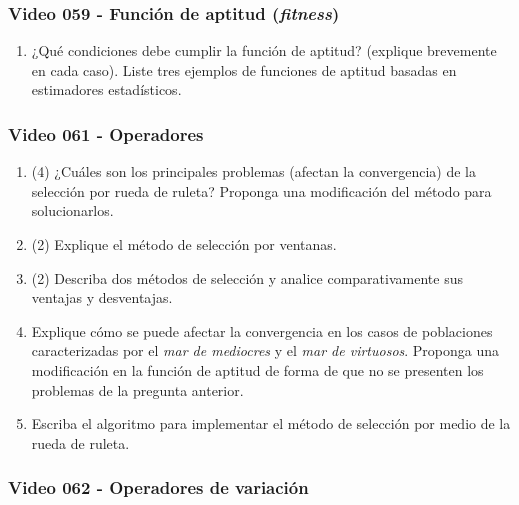 \documentclass[a4paper,10pt,spanish]{article}
\begin{document}
\subsubsection{Video 059 - Función de aptitud (\textit{fitness})}

\begin{enumerate}
\item ¿Qué condiciones debe cumplir la función de aptitud? (explique brevemente en cada caso). Liste tres ejemplos de funciones de aptitud basadas en estimadores estadísticos.
\end{enumerate}

\subsubsection{Video 061 - Operadores}

\begin{enumerate}
\item (4) ¿Cuáles son los principales problemas (afectan la convergencia) de la selección por rueda de ruleta? Proponga una modificación del método para solucionarlos.

\item (2) Explique el método de selección por ventanas.

\item (2) Describa dos métodos de selección y analice comparativamente sus ventajas y desventajas.

\item Explique cómo se puede afectar la convergencia en los casos de poblaciones caracterizadas por el \textit{mar de mediocres} y el \textit{mar de virtuosos}. Proponga una modificación en la función de aptitud de forma de que no se presenten los problemas de la pregunta anterior.

\item Escriba el algoritmo para implementar el método de selección por medio de la rueda de ruleta.
\end{enumerate}

\subsubsection{Video 062 - Operadores de variación}
\end{document}
